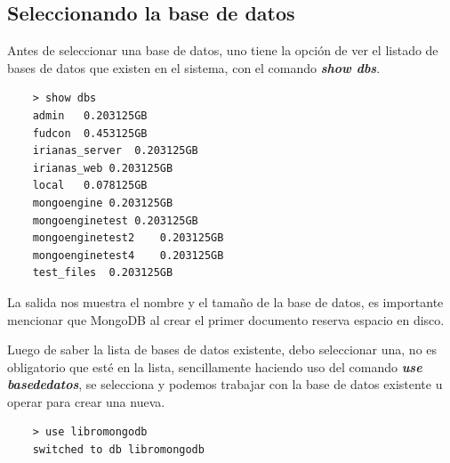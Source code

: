 \subsection{Seleccionando la base de datos}

Antes de seleccionar una base de datos, uno tiene la opci\'on de ver el listado de bases de datos que existen en el sistema, con el comando \textit{\textbf{show dbs}}.

\begin{lstlisting}
    > show dbs
    admin	0.203125GB
    fudcon	0.453125GB
    irianas_server	0.203125GB
    irianas_web	0.203125GB
    local	0.078125GB
    mongoengine	0.203125GB
    mongoenginetest	0.203125GB
    mongoenginetest2	0.203125GB
    mongoenginetest4	0.203125GB
    test_files	0.203125GB
\end{lstlisting}

La salida nos muestra el nombre y el tama\~no de la base de datos, es importante mencionar que MongoDB al crear el primer documento reserva espacio en disco.

Luego de saber la lista de bases de datos existente, debo seleccionar una, no es obligatorio que est\'e en la lista, sencillamente haciendo uso del comando \textit{\textbf{use basededatos}}, se selecciona y podemos trabajar con la base de datos existente u operar para crear una nueva.

\begin{lstlisting}
    > use libromongodb
    switched to db libromongodb
\end{lstlisting}
